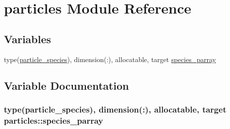 \hypertarget{namespaceparticles}{}\section{particles Module Reference}
\label{namespaceparticles}
\subsection*{Variables}
\begin{DoxyCompactItemize}
\item 
type(\hyperlink{structparticle__speciesmodule_1_1particle__species}{particle\+\_\+species}), dimension(\+:), allocatable, target \hyperlink{namespaceparticles_ab5efcd7db2bd15deeba572ac268eef8e}{species\+\_\+parray}
\end{DoxyCompactItemize}


\subsection{Variable Documentation}
\subsubsection[{\texorpdfstring{species\+\_\+parray}{species_parray}}]{\setlength{\rightskip}{0pt plus 5cm}type({\bf particle\+\_\+species}), dimension(\+:), allocatable, target particles\+::species\+\_\+parray}\hypertarget{namespaceparticles_ab5efcd7db2bd15deeba572ac268eef8e}{}\label{namespaceparticles_ab5efcd7db2bd15deeba572ac268eef8e}
